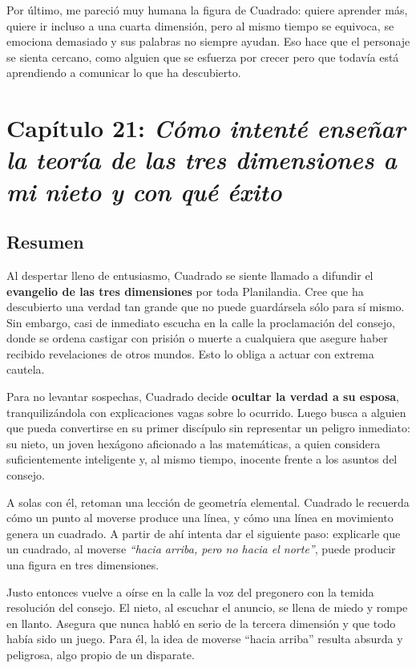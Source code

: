 \documentclass{article}
\begin{document}
Por último, me pareció muy humana la figura de Cuadrado: quiere aprender más, quiere ir incluso a una cuarta dimensión, pero al mismo tiempo se equivoca, se emociona demasiado y sus palabras no siempre ayudan. Eso hace que el personaje se sienta cercano, como alguien que se esfuerza por crecer pero que todavía está aprendiendo a comunicar lo que ha descubierto.

\section*{\textcolor{vividviolet}{Capítulo 21: \emph{Cómo intenté enseñar la teoría de las tres dimensiones a mi nieto y con qué éxito}}}

\subsection*{Resumen}

Al despertar lleno de entusiasmo, Cuadrado se siente llamado a difundir el \textbf{evangelio de las tres dimensiones} por toda Planilandia. Cree que ha descubierto una verdad tan grande que no puede guardársela sólo para sí mismo. Sin embargo, casi de inmediato escucha en la calle la proclamación del consejo, donde se ordena castigar con prisión o muerte a cualquiera que asegure haber recibido revelaciones de otros mundos. Esto lo obliga a actuar con extrema cautela.

Para no levantar sospechas, Cuadrado decide \textbf{ocultar la verdad a su esposa}, tranquilizándola con explicaciones vagas sobre lo ocurrido. Luego busca a alguien que pueda convertirse en su primer discípulo sin representar un peligro inmediato: su nieto, un joven hexágono aficionado a las matemáticas, a quien considera suficientemente inteligente y, al mismo tiempo, inocente frente a los asuntos del consejo.

A solas con él, retoman una lección de geometría elemental. Cuadrado le recuerda cómo un punto al moverse produce una línea, y cómo una línea en movimiento genera un cuadrado. A partir de ahí intenta dar el siguiente paso: explicarle que un cuadrado, al moverse \emph{“hacia arriba, pero no hacia el norte”}, puede producir una figura en tres dimensiones.

Justo entonces vuelve a oírse en la calle la voz del pregonero con la temida resolución del consejo. El nieto, al escuchar el anuncio, se llena de miedo y rompe en llanto. Asegura que nunca habló en serio de la tercera dimensión y que todo había sido un juego. Para él, la idea de moverse “hacia arriba” resulta absurda y peligrosa, algo propio de un disparate.
\end{document}
